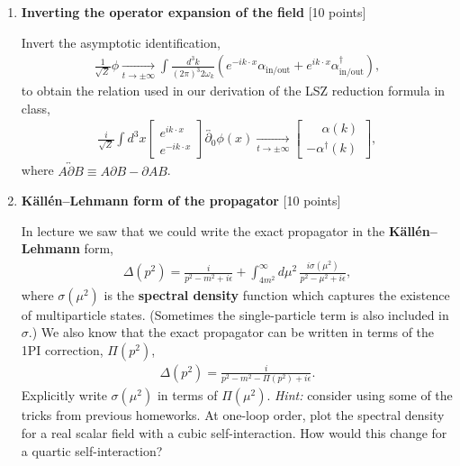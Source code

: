 \documentclass[12pt]{article}
\begin{document}
\begin{enumerate}

\item {\bf Inverting the operator expansion of the field} [10 points]

Invert the asymptotic identification,
\begin{align*}
\frac{1}{\sqrt{Z}}\phi
\underset{t\to \pm \infty}{\longrightarrow}
\int \frac{d^3k}{(2\pi)^3 2\omega_k}
\left(
e^{-ik\cdot x} \alpha_{\text{in/out}}
+
e^{ik\cdot x} \alpha_{\text{in/out}}^\dagger
\right),
\end{align*}
to obtain the relation used in our derivation of the LSZ reduction formula in class,
\begin{align*}
\frac{i}{\sqrt{Z}} \int d^3x
\begin{bmatrix}
e^{ik\cdot x}\\
e^{-ik\cdot x}
\end{bmatrix}
\overleftrightarrow{\partial_0}
\phi(x)
\underset{t\to \pm \infty}{\longrightarrow}
\begin{bmatrix}
\phantom{+}\alpha(k)\\
-\alpha^\dag(k)
\end{bmatrix},
\end{align*}
where $A\overleftrightarrow{\partial} B \equiv A\partial B - \partial A B$.



\item {\bf K\"all\'en--Lehmann form of the propagator} [10 points]

In lecture we saw that we could write the exact propagator in the \textbf{K\"all\'en--Lehmann} form,
\begin{align}
\Delta(p^2)
=
\frac{i}{p^2-m^2+i\epsilon}
+
\int_{4m^2}^\infty d\mu^2\,
\frac{i\sigma(\mu^2)}{p^2-\mu^2+i\epsilon},
\label{eq:Kallen}
\end{align}
where $\sigma(\mu^2)$ is the \textbf{spectral density} function which captures the existence of multiparticle states. (Sometimes the single-particle term is also included in $\sigma$.) 
We also know that the exact propagator can be written in terms of the 1PI correction, $\Pi(p^2)$,
\begin{align*}
\Delta(p^2) = \frac{i}{p^2-m^2-\Pi(p^2)+i\epsilon}.
\label{eq:1PI}
\end{align*}
Explicitly write $\sigma(\mu^2)$ in terms of $\Pi(\mu^2)$. \textit{Hint:} consider using some of the tricks from previous homeworks. At one-loop order, plot the spectral density for a real scalar field with a cubic self-interaction. How would this change for a quartic self-interaction?


\end{enumerate}
\end{document}
